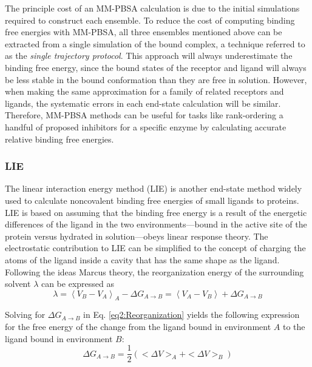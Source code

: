 The principle cost of an MM-PBSA calculation is due to the initial simulations
required to construct each ensemble. To reduce the cost of computing binding
free energies with MM-PBSA, all three ensembles mentioned above can be extracted
from a single simulation of the bound complex, a technique referred to as the
\emph{single trajectory protocol}. \cite{MMPBSApy} This approach will always
underestimate the binding free energy, since the bound states of the receptor
and ligand will always be less stable in the bound conformation than they are
free in solution. However, when making the same approximation for a family of
related receptors and ligands, the systematic errors in each end-state
calculation will be similar. Therefore, MM-PBSA methods can be useful for
tasks like rank-ordering a handful of proposed inhibitors for a specific enzyme
by calculating accurate relative binding free energies. \cite{Homeyer2012}

\subsubsection{LIE}

The linear interaction energy method (LIE) is another end-state method widely
used to calculate noncovalent binding free energies of small ligands to
proteins. LIE is based on assuming that the binding free energy is a result of
the energetic differences of the ligand in the two environments---bound in the
active site of the protein versus hydrated in solution---obeys linear response
theory. \cite{Aqvist_ProteinEng_1994_v7_p385} The electrostatic contribution to
LIE can be simplified to the concept of charging the atoms of the ligand inside
a cavity that has the same shape as the ligand. Following the ideas Marcus theory,
\cite{Marcus1955} the reorganization energy of the surrounding solvent $\lambda$
can be expressed as \cite{Aqvist_ProteinEng_1994_v7_p385}
\begin{equation}
   \lambda = \left \langle V_B - V_A \right \rangle _ A - \Delta G _ {A
         \rightarrow B} = \left \langle V _ A - V _ B \right \rangle + \Delta G
         _ {A \rightarrow B}
   \label{eq2:Reorganization}
\end{equation}

Solving for $\Delta G _ {A \rightarrow B}$ in Eq. \ref{eq2:Reorganization}
yields the following expression for the free energy of the change from the
ligand bound in environment $A$ to the ligand bound in environment $B$:
\begin{equation}
   \Delta G _ {A \rightarrow B} = \frac 1 2 \left( < \Delta V > _ A + < \Delta V
               > _ B \right)
   \label{eq2:ReorganizationFE}
\end{equation}


